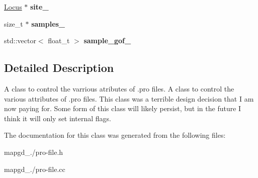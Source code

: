 \begin{DoxyCompactItemize}
\item 
\hypertarget{classprofile__header_abe8bd2df6ef09a42928a59fd5320e995}{\hyperlink{classLocus}{Locus} $\ast$ {\bfseries site\-\_\-}}\label{classprofile__header_abe8bd2df6ef09a42928a59fd5320e995}

\item 
\hypertarget{classprofile__header_ad45b3fdc2739d4b0ba40af88e83e58ae}{size\-\_\-t $\ast$ {\bfseries samples\-\_\-}}\label{classprofile__header_ad45b3fdc2739d4b0ba40af88e83e58ae}

\item 
\hypertarget{classprofile__header_a573cc32efa43844c554895ec6835ebce}{std\-::vector$<$ float\-\_\-t $>$ {\bfseries sample\-\_\-gof\-\_\-}}\label{classprofile__header_a573cc32efa43844c554895ec6835ebce}

\end{DoxyCompactItemize}


\subsection{Detailed Description}
A class to control the varrious atributes of .pro files. A class to control the various attributes of .pro files. This class was a terrible design decision that I am now paying for. Some form of this class will likely persist, but in the future I think it will only set internal flags. 

The documentation for this class was generated from the following files\-:\begin{DoxyCompactItemize}
\item 
mapgd\-\_./pro-\/file.\-h\item 
mapgd\-\_./pro-\/file.\-cc\end{DoxyCompactItemize}

